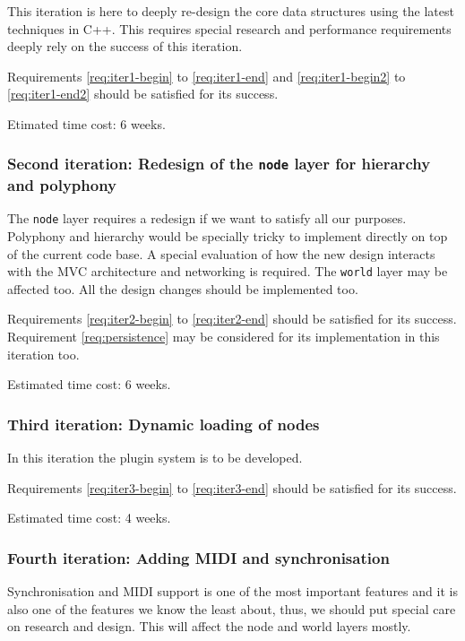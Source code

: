 This iteration is here to deeply re-design the core data structures
using the latest techniques in C++. This requires special research and
performance requirements deeply rely on the success of this
iteration. 

Requirements \ref{req:iter1-begin} to \ref{req:iter1-end} and
\ref{req:iter1-begin2} to \ref{req:iter1-end2} should be satisfied for
its success.

Etimated time cost: 6 weeks.

\subsubsection{Second iteration: Redesign of the \texttt{node} layer
  for hierarchy and polyphony}

The \texttt{node} layer requires a redesign if we want to satisfy all
our purposes. Polyphony and hierarchy would be specially tricky to
implement directly on top of the current code base. A special
evaluation of how the new design interacts with the MVC architecture
and networking is required. The \texttt{world} layer may be affected
too. All the design changes should be implemented too.

Requirements \ref{req:iter2-begin} to \ref{req:iter2-end} should be
satisfied for its success. Requirement \ref{req:persistence} may be
considered for its implementation in this iteration too.

Estimated time cost: 6 weeks.

\subsubsection{Third iteration: Dynamic loading of nodes}

In this iteration the plugin system is to be developed.

Requirements \ref{req:iter3-begin} to \ref{req:iter3-end} should be
satisfied for its success.

Estimated time cost: 4 weeks.

\subsubsection{Fourth iteration: Adding MIDI and synchronisation}

Synchronisation and MIDI support is one of the most important
features and it is also one of the features we know the least about,
thus, we should put special care on research and design. This will
affect the node and world layers mostly.

